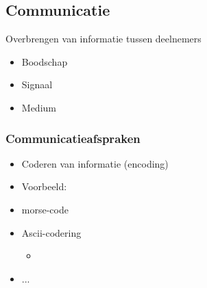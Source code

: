 \documentclass{article}
\begin{document}
\subsection{Communicatie}
Overbrengen van informatie tussen deelnemers
\begin{itemize}
    \item Boodschap
    \item Signaal
    \item Medium
\end{itemize}

\subsubsection{Communicatieafspraken}
\begin{itemize}
    \item Coderen van informatie (encoding)
    \item Voorbeeld:
        \item morse-code
        \item Ascii-codering
        \begin{itemize}
            \item 
        \end{itemize}
        \item ...
\end{itemize}
\end{document}
